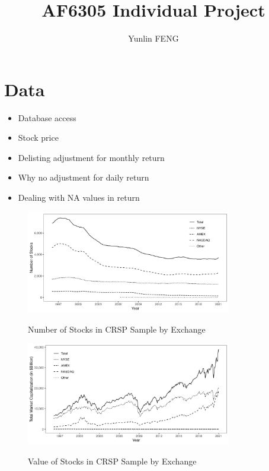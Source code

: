 \documentclass{article}
\author{Yunlin FENG}
\title{AF6305 Individual Project}
\begin{document}
\maketitle

\section{Data}

\begin{itemize}
  \item Database access
  \item Stock price
  \item Delisting adjustment for monthly return
  \item Why no adjustment for daily return
  \item Dealing with NA values in return
\end{itemize}

\pagebreak

\begin{figure}[htbp]
  \centering
  \caption{Number of Stocks in CRSP Sample by Exchange}
  \includegraphics[width=0.8\textwidth]{figs/stock_exchange_composition.png}
  \label{fig:stock_exchange_composition}
\end{figure}

\begin{figure}[htbp]
  \centering
  \caption{Value of Stocks in CRSP Sample by Exchange}
  \includegraphics[width=0.8\textwidth]{figs/value_of_stock_in_exchanges.png}
  \label{fig:value_of_stock_in_exchanges}
\end{figure}





\end{document}
